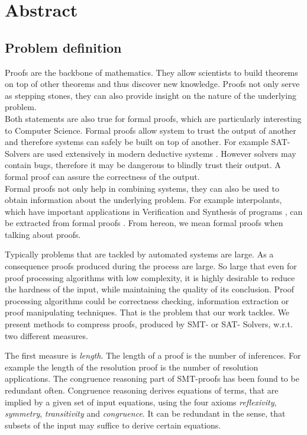\chapter*{Abstract}

\section{Problem definition}

Proofs are the backbone of mathematics. 
They allow scientists to build theorems on top of other theorems and thus discover new knowledge.
Proofs not only serve as stepping stones, they can also provide insight on the nature of the underlying problem.\\
Both statements are also true for formal proofs, which are particularly interesting to Computer Science.
Formal proofs allow system to trust the output of another and therefore systems can safely be built on top of another. 
For example SAT-Solvers are used extensively in modern deductive systems \cite{Biere2009}. 
However solvers may contain bugs, therefore it may be dangerous to blindly trust their output.
A formal proof can assure the correctness of the output.\\
Formal proofs not only help in combining systems, they can also be used to obtain information about the underlying problem.
For example interpolants, which have important applications in Verification and Synthesis of programs \cite{McMill2005}, can be extracted from formal proofs \cite{Hofferek2013}.
From hereon, we mean formal proofs when talking about proofs.

Typically problems that are tackled by automated systems are large. 
As a consequence proofs produced during the process are large.
So large that even for proof processing algorithms with low complexity, it is highly desirable to reduce the hardness of the input, while maintaining the quality of its conclusion.
Proof processing algorithms could be correctness checking, information extraction or proof manipulating techniques.
That is the problem that our work tackles.
We present methods to compress proofs, produced by SMT- or SAT- Solvers, w.r.t. two different measures.

The first measure is \emph{length}.
The length of a proof is the number of inferences.
For example the length of the resolution proof is the number of resolution applications.
The congruence reasoning part of SMT-proofs has been found to be redundant often.
Congruence reasoning derives equations of terms, that are implied by a given set of input equations, using the four axioms \emph{reflexivity}, \emph{symmetry}, \emph{transitivity} and \emph{congruence}. 
It can be redundant in the sense, that subsets of the input may suffice to derive certain equations.

